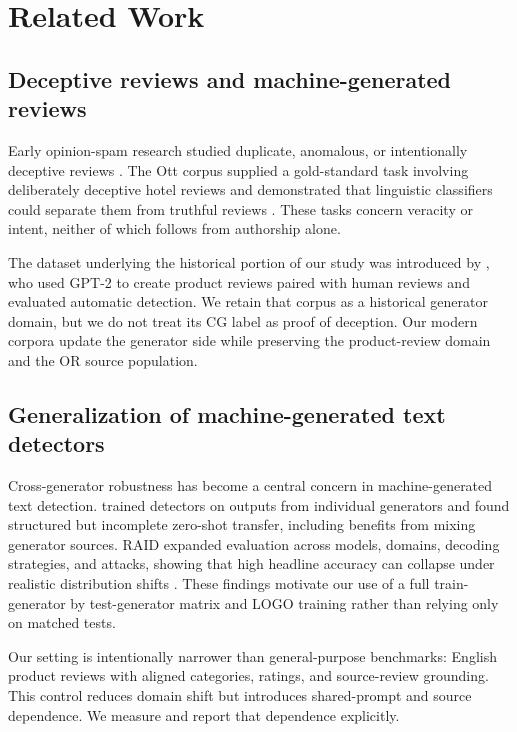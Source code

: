 \documentclass[utf8]{FrontiersinHarvard}
\begin{document}
\section{Related Work}

\subsection{Deceptive reviews and machine-generated reviews}

Early opinion-spam research studied duplicate, anomalous, or intentionally deceptive reviews \citep{Jindal2008}. The Ott corpus supplied a gold-standard task involving deliberately deceptive hotel reviews and demonstrated that linguistic classifiers could separate them from truthful reviews \citep{Ott2011}. These tasks concern veracity or intent, neither of which follows from authorship alone.

The dataset underlying the historical portion of our study was introduced by \citet{Salminen2022}, who used GPT-2 to create product reviews paired with human reviews and evaluated automatic detection. We retain that corpus as a historical generator domain, but we do not treat its CG label as proof of deception. Our modern corpora update the generator side while preserving the product-review domain and the OR source population.

\subsection{Generalization of machine-generated text detectors}

Cross-generator robustness has become a central concern in machine-generated text detection. \citet{Pu2023} trained detectors on outputs from individual generators and found structured but incomplete zero-shot transfer, including benefits from mixing generator sources. RAID expanded evaluation across models, domains, decoding strategies, and attacks, showing that high headline accuracy can collapse under realistic distribution shifts \citep{Dugan2024}. These findings motivate our use of a full train-generator by test-generator matrix and LOGO training rather than relying only on matched tests.

Our setting is intentionally narrower than general-purpose benchmarks: English product reviews with aligned categories, ratings, and source-review grounding. This control reduces domain shift but introduces shared-prompt and source dependence. We measure and report that dependence explicitly.
\end{document}
